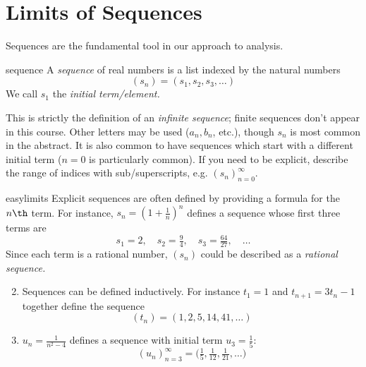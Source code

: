 \graphicspath{{notes/2limits/asy/}}


\section{Limits of Sequences}

Sequences are the fundamental tool in our approach to analysis.

\begin{defn}{}{sequence}
A \emph{sequence} of real numbers is a list indexed by the natural numbers
\[(s_n)=(s_1,s_2,s_3,\ldots)\]
We call $s_1$ the \emph{initial term/element.}
\end{defn}

This is strictly the definition of an \emph{infinite sequence}; finite sequences don't appear in this course. Other letters may be used ($a_n,b_n$, etc.), though $s_n$ is most common in the abstract. It is also common to have sequences which start with a different initial term ($n=0$ is particularly common). If you need to be explicit, describe the range of indices with sub/superscripts, e.g.{} $(s_n)_{n=0}^\infty$.


\begin{examples}{}{easylimits}
	\exstart Explicit sequences are often defined by providing a formula for the $n\th$ term. For instance, $s_n=\left(1+\frac 1n\right)^n$ defines a sequence whose first three terms are
	\[s_1=2,\quad s_2=\tfrac 94,\quad s_3=\tfrac{64}{27},\quad\ldots\]
	Since each term is a rational number, $(s_n)$ could be described as a \emph{rational sequence.}
	\begin{enumerate}\setcounter{enumi}{1}
	  \item\label{ex:easylimits2} Sequences can be defined inductively. For instance $t_1=1$ and $t_{n+1}=3t_n-1$ together define the sequence
	  \[(t_n)=(1,2,5,14,41,\ldots)\]
	  \item $u_n=\frac 1{n^2-4}$ defines a sequence with initial term $u_3=\frac 15$:
	  \[(u_n)_{n=3}^\infty =\bigl(\tfrac 15,\tfrac 1{12},\tfrac 1{21},\ldots\bigr)\]
	\end{enumerate}
\end{examples}




